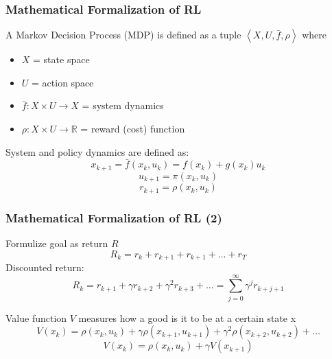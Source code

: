 \documentclass{beamer}
\begin{document}
	
	\begin{frame}\frametitle{Mathematical Formalization of RL}
		\begin{definition}
			\fontsize{9}{4}\selectfont 
			A Markov Decision Process (MDP) is defined as a tuple $ \left\langle X, U, \bar{f}, \rho\right\rangle  $ where
			\begin{itemize}
				\item $ X $ = state space
				\item $ U $ = action space
				\item $ \bar{f} : X \times U \rightarrow  X $ = system dynamics
				\item $ \rho: X \times U \rightarrow \mathbb{R} $ = reward (cost) function
			\end{itemize}
		\end{definition}
		\pause
		\begin{definition}
			\fontsize{9}{4}\selectfont
			System and policy dynamics are defined as:
			\begin{equation}
			x_{k+1} = \bar{f}(x_k,u_k) = f(x_k) + g(x_k)u_k 			
			\end{equation}
			\begin{equation}
			u_{k+1} = \pi(x_k,u_k) 	
			\end{equation}
			\begin{equation}
			r_{k+1} = \rho(x_k,u_k)	
			\end{equation}		
		\end{definition}
	\end{frame}
	
	\begin{frame}\frametitle{Mathematical Formalization of RL (2)}
		\begin{definition}
			\fontsize{9}{4}\selectfont
			Formulize goal as return $ R $
			\begin{equation}
			R_k = r_k + r_{k+1} + r_{k+1} + \dots + r_T 
			\end{equation}
			Discounted return:		
			\begin{equation}
			R_k = r_{k+1} + \gamma r_{k+2} + \gamma^2r_{k+3} + \dots = \sum_{j=0}^{\infty}\gamma^jr_{k+j+1}
			\end{equation}		
		\end{definition}
		\pause
		\begin{definition}
			\fontsize{9}{4}\selectfont
			Value function $ V $ measures how a good is it to be at a certain state x 
			\begin{equation}
			V(x_{k}) = \rho(x_k,u_k) + \gamma \rho(x_{k+1},u_{k+1}) + \gamma^2 \rho(x_{k+2},u_{k+2}) + \dots 			
			\end{equation}
			\begin{equation}
			V(x_{k}) = \rho(x_k,u_k) + \gamma V(x_{k+1}) 			
			\end{equation}
		\end{definition}
	\end{frame}
	
\end{document}
